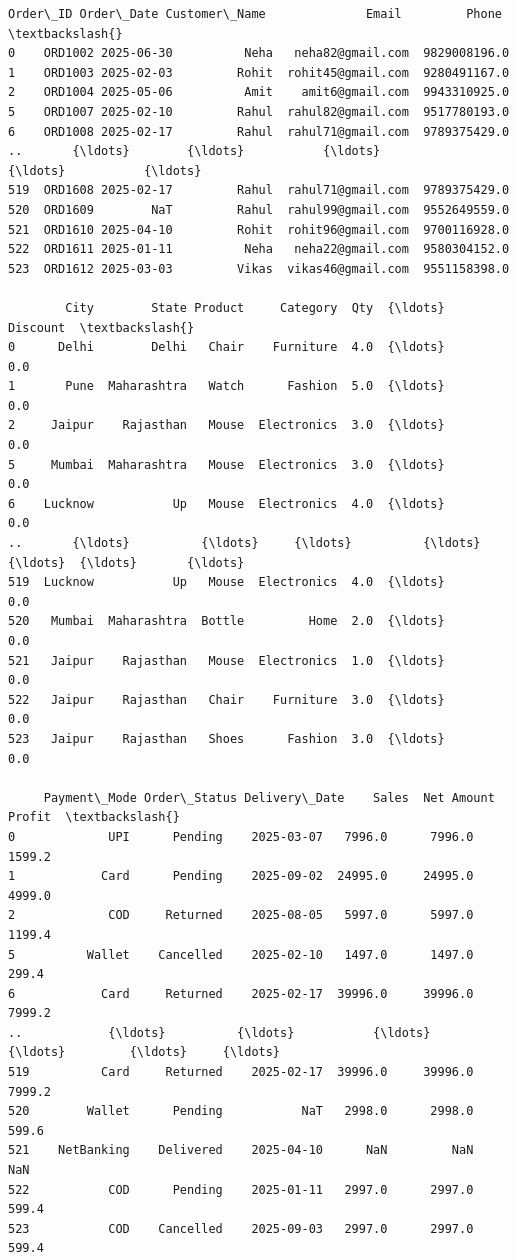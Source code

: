 \documentclass[11pt]{article}
\makeatletter
\newcommand{\boxspacing}{\kern\kvtcb@left@rule\kern\kvtcb@boxsep}
\newcommand{\prompt}[4]{
        {\ttfamily\llap{{\color{#2}[#3]:\hspace{3pt}#4}}\vspace{-\baselineskip}}
    }
\makeatother
\begin{document}
            \begin{tcolorbox}[breakable, size=fbox, boxrule=.5pt, pad at break*=1mm, opacityfill=0]
\prompt{Out}{outcolor}{49}{\boxspacing}
\begin{Verbatim}[commandchars=\\\{\}]
    Order\_ID Order\_Date Customer\_Name              Email         Phone  \textbackslash{}
0    ORD1002 2025-06-30          Neha   neha82@gmail.com  9829008196.0
1    ORD1003 2025-02-03         Rohit  rohit45@gmail.com  9280491167.0
2    ORD1004 2025-05-06          Amit    amit6@gmail.com  9943310925.0
5    ORD1007 2025-02-10         Rahul  rahul82@gmail.com  9517780193.0
6    ORD1008 2025-02-17         Rahul  rahul71@gmail.com  9789375429.0
..       {\ldots}        {\ldots}           {\ldots}                {\ldots}           {\ldots}
519  ORD1608 2025-02-17         Rahul  rahul71@gmail.com  9789375429.0
520  ORD1609        NaT         Rahul  rahul99@gmail.com  9552649559.0
521  ORD1610 2025-04-10         Rohit  rohit96@gmail.com  9700116928.0
522  ORD1611 2025-01-11          Neha   neha22@gmail.com  9580304152.0
523  ORD1612 2025-03-03         Vikas  vikas46@gmail.com  9551158398.0

        City        State Product     Category  Qty  {\ldots}  Discount  \textbackslash{}
0      Delhi        Delhi   Chair    Furniture  4.0  {\ldots}       0.0
1       Pune  Maharashtra   Watch      Fashion  5.0  {\ldots}       0.0
2     Jaipur    Rajasthan   Mouse  Electronics  3.0  {\ldots}       0.0
5     Mumbai  Maharashtra   Mouse  Electronics  3.0  {\ldots}       0.0
6    Lucknow           Up   Mouse  Electronics  4.0  {\ldots}       0.0
..       {\ldots}          {\ldots}     {\ldots}          {\ldots}  {\ldots}  {\ldots}       {\ldots}
519  Lucknow           Up   Mouse  Electronics  4.0  {\ldots}       0.0
520   Mumbai  Maharashtra  Bottle         Home  2.0  {\ldots}       0.0
521   Jaipur    Rajasthan   Mouse  Electronics  1.0  {\ldots}       0.0
522   Jaipur    Rajasthan   Chair    Furniture  3.0  {\ldots}       0.0
523   Jaipur    Rajasthan   Shoes      Fashion  3.0  {\ldots}       0.0

     Payment\_Mode Order\_Status Delivery\_Date    Sales  Net Amount  Profit  \textbackslash{}
0             UPI      Pending    2025-03-07   7996.0      7996.0  1599.2
1            Card      Pending    2025-09-02  24995.0     24995.0  4999.0
2             COD     Returned    2025-08-05   5997.0      5997.0  1199.4
5          Wallet    Cancelled    2025-02-10   1497.0      1497.0   299.4
6            Card     Returned    2025-02-17  39996.0     39996.0  7999.2
..            {\ldots}          {\ldots}           {\ldots}      {\ldots}         {\ldots}     {\ldots}
519          Card     Returned    2025-02-17  39996.0     39996.0  7999.2
520        Wallet      Pending           NaT   2998.0      2998.0   599.6
521    NetBanking    Delivered    2025-04-10      NaN         NaN     NaN
522           COD      Pending    2025-01-11   2997.0      2997.0   599.4
523           COD    Cancelled    2025-09-03   2997.0      2997.0   599.4


\end{Verbatim}
\end{tcolorbox}
\end{document}
